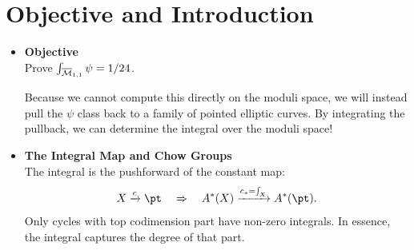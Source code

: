 \documentclass[12pt]{memoir}
\begin{document}
\section{Objective and Introduction}

\begin{itemize}
    \item \textbf{Objective}\\
          Prove \(\int_{\overline{\mathcal{M}}_{1,1}}\psi = 1/24\).

          Because we cannot compute this directly on the moduli space, we will instead pull the $\psi$ class back to a family of pointed elliptic curves. By integrating the pullback, we can determine the integral over the moduli space!

    \item \textbf{The Integral Map and Chow Groups}\\
          The integral is the pushforward of the constant map:
          \[
              X\xrightarrow[]{c}\pt\quad\To\quad A^\ast(X)\xrightarrow[]{c_\ast=\int_X}A^\ast(\pt).
          \]
          Only cycles with top codimension part have non-zero integrals. In essence, the integral captures the degree of that part.

          \begin{center}
          \end{center}


\end{itemize}
\end{document}
